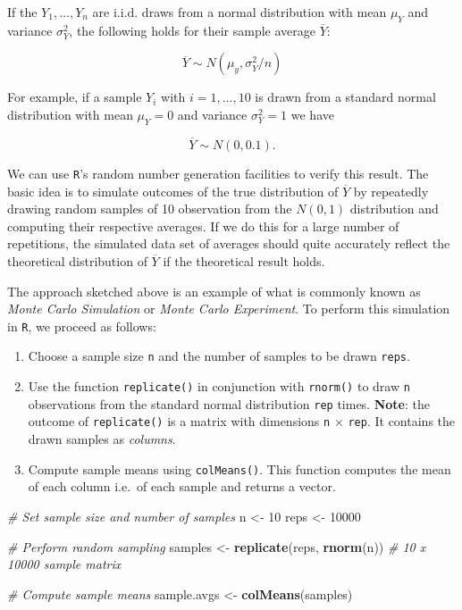 \documentclass[]{book}
\newenvironment{Shaded}{\begin{snugshade}}{\end{snugshade}}
\newcommand{\KeywordTok}[1]{\textcolor[rgb]{0.13,0.29,0.53}{\textbf{#1}}}
\newcommand{\DecValTok}[1]{\textcolor[rgb]{0.00,0.00,0.81}{#1}}
\newcommand{\StringTok}[1]{\textcolor[rgb]{0.31,0.60,0.02}{#1}}
\newcommand{\CommentTok}[1]{\textcolor[rgb]{0.56,0.35,0.01}{\textit{#1}}}
\newcommand{\NormalTok}[1]{#1}
\providecommand{\tightlist}{%
  \setlength{\itemsep}{0pt}\setlength{\parskip}{0pt}}
\theoremstyle{definition}
\theoremstyle{definition}
\theoremstyle{definition}
\theoremstyle{remark}
\begin{document}
If the \(Y_1,\dots,Y_n\) are i.i.d. draws from a normal distribution
with mean \(\mu_Y\) and variance \(\sigma_Y^2\), the following holds for
their sample average \(\overline{Y}\):

\[ \overline{Y} \sim N(\mu_y, \sigma_Y^2/n) \tag{2.4} \]

For example, if a sample \(Y_i\) with \(i=1,\dots,10\) is drawn from a
standard normal distribution with mean \(\mu_Y = 0\) and variance
\(\sigma_Y^2=1\) we have

\[ \overline{Y} \sim N(0,0.1).\]

We can use \texttt{R}'s random number generation facilities to verify
this result. The basic idea is to simulate outcomes of the true
distribution of \(\overline{Y}\) by repeatedly drawing random samples of
10 observation from the \(N(0,1)\) distribution and computing their
respective averages. If we do this for a large number of repetitions,
the simulated data set of averages should quite accurately reflect the
theoretical distribution of \(\overline{Y}\) if the theoretical result
holds.

The approach sketched above is an example of what is commonly known as
\emph{Monte Carlo Simulation} or \emph{Monte Carlo Experiment}. To
perform this simulation in \texttt{R}, we proceed as follows:

\begin{enumerate}
\def\labelenumi{\arabic{enumi}.}
\tightlist
\item
  Choose a sample size \texttt{n} and the number of samples to be drawn
  \texttt{reps}.
\item
  Use the function \texttt{replicate()} in conjunction with
  \texttt{rnorm()} to draw \texttt{n} observations from the standard
  normal distribution \texttt{rep} times. \textbf{Note}: the outcome of
  \texttt{replicate()} is a matrix with dimensions \texttt{n} \(\times\)
  \texttt{rep}. It contains the drawn samples as \emph{columns}.
\item
  Compute sample means using \texttt{colMeans()}. This function computes
  the mean of each column i.e.~of each sample and returns a vector.
\end{enumerate}

\begin{Shaded}
\begin{Highlighting}[]
\CommentTok{# Set sample size and number of samples}
\NormalTok{n <-}\StringTok{ }\DecValTok{10}
\NormalTok{reps <-}\StringTok{ }\DecValTok{10000}

\CommentTok{# Perform random sampling}
\NormalTok{samples <-}\StringTok{ }\KeywordTok{replicate}\NormalTok{(reps, }\KeywordTok{rnorm}\NormalTok{(n)) }\CommentTok{# 10 x 10000 sample matrix}

\CommentTok{# Compute sample means}
\NormalTok{sample.avgs <-}\StringTok{ }\KeywordTok{colMeans}\NormalTok{(samples)}
\end{Highlighting}
\end{Shaded}
\end{document}
